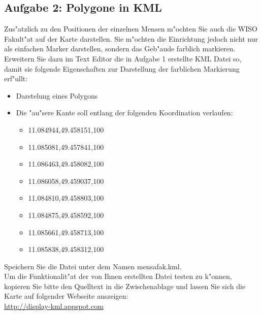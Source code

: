 \subsection{Aufgabe 2: Polygone in KML}
Zus"atzlich zu den Positionen der einzelnen Mensen m"ochten Sie auch die WISO Fakult"at auf der Karte darstellen.
Sie m"ochten die Einrichtung jedoch nicht nur als einfachen Marker darstellen, sondern das Geb"aude farblich markieren.\\
Erweitern Sie dazu im Text Editor die in Aufgabe 1 erstellte KML Datei so, damit sie folgende Eigenschaften zur Darstellung der farblichen Markierung erf"ullt:
\begin{itemize}
    \item Darstelung eines Polygons
    \item Die "au"sere Kante soll entlang der folgenden Koordination verlaufen:
    \begin{itemize}
        \item 11.084944,49.458151,100
        \item 11.085081,49.457841,100
        \item 11.086463,49.458082,100
        \item 11.086058,49.459037,100
        \item 11.084810,49.458803,100
        \item 11.084875,49.458592,100
        \item 11.085661,49.458713,100
        \item 11.085838,49.458312,100
    \end{itemize}
\end{itemize}
Speichern Sie die Datei unter dem Namen mensafak.kml.\\
Um die Funktionalit"at der von Ihnen erstellten Datei testen zu k"onnen, kopieren Sie bitte den Quelltext in die Zwischenablage und lassen Sie sich die Karte auf folgender Webseite anszeigen:\\ 
\url{http://display-kml.appspot.com}








